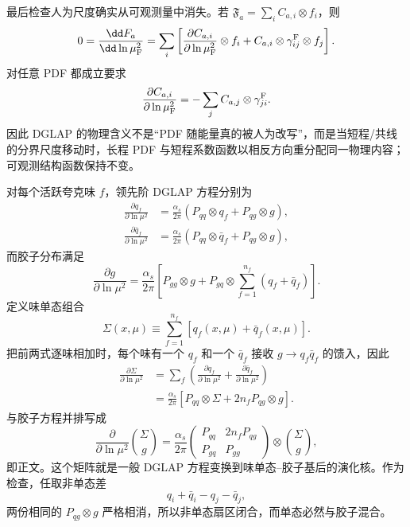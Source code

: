 \begin{derivation}[部分子分布的重整化与演化]
最后检查人为尺度确实从可观测量中消失。若
$\mathfrak F_a=\sum_i C_{a,i}\otimes f_i$，则
\begin{align*}
 0=\frac{\dd F_a}{\dd\ln\mu_{\rm F}^2}
 =\sum_i\left[
 \frac{\partial C_{a,i}}{\partial\ln\mu_{\rm F}^2}\otimes f_i
 +C_{a,i}\otimes\gamma^{\rm F}_{ij}\otimes f_j
 \right].
\end{align*}
对任意 PDF 都成立要求
\begin{equation*}
 \frac{\partial C_{a,i}}{\partial\ln\mu_{\rm F}^2}
 =-\sum_j C_{a,j}\otimes\gamma^{\rm F}_{ji}.
\end{equation*}
因此 DGLAP 的物理含义不是“PDF 随能量真的被人为改写”，而是当短程/共线的分界尺度移动时，长程 PDF 与短程系数函数以相反方向重分配同一物理内容；可观测结构函数保持不变。
\end{derivation}

\begin{derivation}[结构函数的标度破坏]
对每个活跃夸克味 $f$，领先阶 DGLAP 方程分别为
\begin{align*}
 \frac{\partial q_f}{\partial\ln\mu^2}
 &=\frac{\alpha_s}{2\pi}
 \left(P_{qq}\otimes q_f+P_{qg}\otimes g\right),\\
 \frac{\partial \bar q_f}{\partial\ln\mu^2}
 &=\frac{\alpha_s}{2\pi}
 \left(P_{qq}\otimes \bar q_f+P_{qg}\otimes g\right),
\end{align*}
而胶子分布满足
\begin{equation*}
 \frac{\partial g}{\partial\ln\mu^2}
 =\frac{\alpha_s}{2\pi}
 \left[
 P_{gg}\otimes g
 +P_{gq}\otimes\sum_{f=1}^{n_f}(q_f+\bar q_f)
 \right].
\end{equation*}
定义味单态组合
\begin{equation*}
 \Sigma(x,\mu)\equiv
 \sum_{f=1}^{n_f}[q_f(x,\mu)+\bar q_f(x,\mu)].
\end{equation*}
把前两式逐味相加时，每个味有一个 $q_f$ 和一个 $\bar q_f$ 接收 $g\to q_f\bar q_f$ 的馈入，因此
\begin{align*}
 \frac{\partial\Sigma}{\partial\ln\mu^2}
 &=\sum_f\left(
 \frac{\partial q_f}{\partial\ln\mu^2}
 +\frac{\partial\bar q_f}{\partial\ln\mu^2}
 \right)\\
 &=\frac{\alpha_s}{2\pi}
 \left[P_{qq}\otimes\Sigma
 +2n_fP_{qg}\otimes g\right].
\end{align*}
与胶子方程并排写成
\begin{equation*}
 \frac{\partial}{\partial\ln\mu^2}
 \binom{\Sigma}{g}
 =\frac{\alpha_s}{2\pi}
 \begin{pmatrix}
 P_{qq}&2n_fP_{qg}\\
 P_{gq}&P_{gg}
 \end{pmatrix}\otimes
 \binom{\Sigma}{g},
\end{equation*}
即正文。这个矩阵就是一般 DGLAP 方程变换到味单态--胶子基后的演化核。作为检查，任取非单态差
\begin{equation*}
 q_i+\bar q_i-q_j-\bar q_j,
\end{equation*}
两份相同的 $P_{qg}\otimes g$ 严格相消，所以非单态扇区闭合，而单态必然与胶子混合。


\end{derivation}
